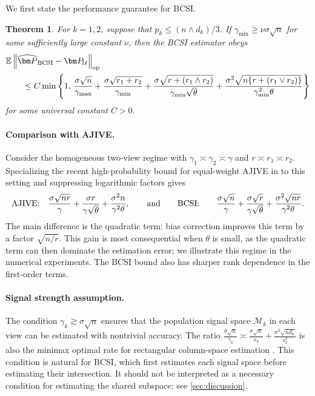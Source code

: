 \documentclass[11pt]{article}
\newtheorem{theorem}{Theorem}
\newcommand{\opn}[1]{\left\lVert #1\right\rVert_{\mathrm{op}}}
\newcommand{\cU}{\mathcal{U}}
\newcommand{\cM}{\mathcal{M}}
\begin{document}
We first state the performance guarantee for BCSI.
\begin{theorem}
\label{thm:upper}
For $k=1,2$, suppose that $p_k\le(n\wedge d_k)/3$. If $\gamma_{\min} \ge\nu\sigma\sqrt n$ for some sufficiently large constant $\nu$, 
then the BCSI estimator obeys
\begin{align}
\label{eq:main}
  &\mathbb E
  \opn{
    \widehat{\bm P}_{\rm BCSI}-\bm P_{\cU}
  } \notag \\
  &\qquad 
  \le
  C\min\left\{
    1,\,
    \frac{\sigma\sqrt n}{\gamma_{\max}}
    +
    \frac{\sigma\sqrt{r_1+r_2}}{\gamma_{\min}}
    +
    \frac{
      \sigma\sqrt{r+ (r_1\wedge r_2)}
    }{
      \gamma_{\min}\sqrt\theta
    }
    +
    \frac{
      \sigma^2\sqrt{n\{r+(r_1\vee r_2)\}}
    }{
      \gamma_{\min}^2\theta
    }
  \right\}
\end{align}
for some universal constant $C>0$.
\end{theorem}


\paragraph{Comparison with AJIVE.}
Consider the homogeneous two-view regime with 
$\gamma_1\asymp\gamma_2\asymp\gamma$ and
$r\asymp r_1\asymp r_2$.
Specializing the recent high-probability bound for equal-weight AJIVE
in \citet{li2025heterojive} to this setting and suppressing logarithmic
factors gives
\[
\begin{aligned}
\text{\rm AJIVE:}\quad&
  \frac{\sigma\sqrt{nr}}{\gamma}
  +
  \frac{\sigma r}{\gamma\sqrt\theta}
  +
  \frac{\sigma^2 n}{\gamma^2\theta},
\qquad \text{and} \qquad 
\text{\rm BCSI:}\quad&
  \frac{\sigma\sqrt n}{\gamma}
  +
  \frac{\sigma\sqrt r}{\gamma\sqrt\theta}
  +
  \frac{\sigma^2\sqrt{nr}}{\gamma^2\theta}.
\end{aligned}
\]
The main difference is the quadratic term: bias correction
improves this term by a factor $\sqrt{n/r}$.
This gain is most consequential when $\theta$ is small, as the quadratic
term can then dominate the estimation error; we illustrate this regime in
the numerical experiments.
The BCSI bound also has sharper rank dependence in the first-order terms.




\paragraph{Signal strength assumption.}
The condition
$\gamma_k\gtrsim\sigma\sqrt n$ ensures that the population signal space $\cM_k$ in
each view can be estimated with nontrivial accuracy. The ratio
$\frac{\sigma \sqrt{n}}{\gamma_k}
\asymp 
\frac{\sigma \sqrt{n}}{s_k}+\frac{\sigma^2 \sqrt{nd_k}}{s_k^2}$
is also the minimax optimal rate for rectangular column-space estimation
\citep{cai2018rate,Cai2021Unbalanced}. This condition is natural for BCSI,
which first estimates each signal space before estimating their intersection.
It should not be interpreted as a necessary condition for estimating the
shared subspace; see \cref{sec:discussion}.
\end{document}
